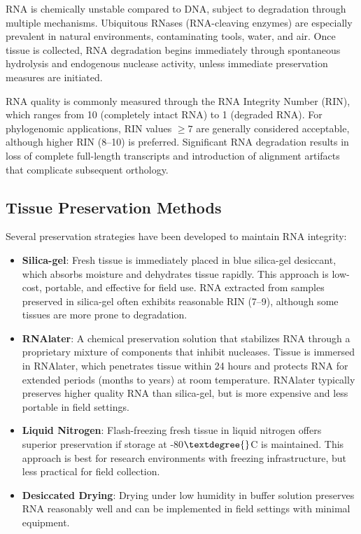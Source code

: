 RNA is chemically unstable compared to DNA, subject to degradation through multiple mechanisms. Ubiquitous RNases (RNA-cleaving enzymes) are especially prevalent in natural environments, contaminating tools, water, and air. Once tissue is collected, RNA degradation begins immediately through spontaneous hydrolysis and endogenous nuclease activity, unless immediate preservation measures are initiated.

RNA quality is commonly measured through the RNA Integrity Number (RIN), which ranges from 10 (completely intact RNA) to 1 (degraded RNA). For phylogenomic applications, RIN values $\geq 7$ are generally considered acceptable, although higher RIN (8--10) is preferred. Significant RNA degradation results in loss of complete full-length transcripts and introduction of alignment artifacts that complicate subsequent orthology.

\subsection{Tissue Preservation Methods}

Several preservation strategies have been developed to maintain RNA integrity:

\begin{itemize}
\item \textbf{Silica-gel}: Fresh tissue is immediately placed in blue silica-gel desiccant, which absorbs moisture and dehydrates tissue rapidly. This approach is low-cost, portable, and effective for field use. RNA extracted from samples preserved in silica-gel often exhibits reasonable RIN (7--9), although some tissues are more prone to degradation.

\item \textbf{RNAlater}: A chemical preservation solution that stabilizes RNA through a proprietary mixture of components that inhibit nucleases. Tissue is immersed in RNAlater, which penetrates tissue within 24 hours and protects RNA for extended periods (months to years) at room temperature. RNAlater typically preserves higher quality RNA than silica-gel, but is more expensive and less portable in field settings.

\item \textbf{Liquid Nitrogen}: Flash-freezing fresh tissue in liquid nitrogen offers superior preservation if storage at -80$\textdegree{}$C is maintained. This approach is best for research environments with freezing infrastructure, but less practical for field collection.

\item \textbf{Desiccated Drying}: Drying under low humidity in buffer solution preserves RNA reasonably well and can be implemented in field settings with minimal equipment.
\end{itemize}

